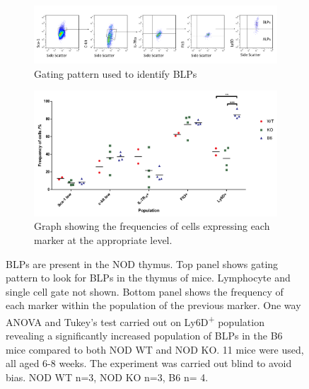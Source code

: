 \begin{figure}
	\begin{subfigure}{\textwidth}
	\includegraphics[width=\textwidth]{Figures/BLPgating.png}
	\caption{Gating pattern used to identify BLPs}
	\label{subfig:BLPgating}
	\end{subfigure}
	\begin{subfigure}{\textwidth}
	\includegraphics[width=\textwidth]{Figures/ProgenitorMarkers.pdf}
	\caption{Graph showing the frequencies of cells expressing each marker at the appropriate level.}
	\label{subfig:BLPgraph}
	\end{subfigure}
\caption{BLPs are present in the NOD thymus. 
Top panel shows gating pattern to look for BLPs in the thymus of mice. Lymphocyte and single cell gate not shown.
Bottom panel shows the frequency of each marker within the population of the previous marker.
One way ANOVA and Tukey's test carried out on Ly6D\textsuperscript{+} population revealing a significantly increased population of BLPs in the B6 mice compared to both NOD WT and NOD KO.
11 mice were used, all aged 6-8 weeks. 
The experiment was carried out blind to avoid bias. 
NOD WT n=3, NOD KO n=3, B6 n= 4.}
\label{fig:BLPs}
\end{figure}







